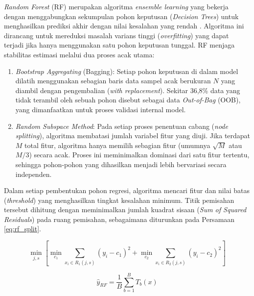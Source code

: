 \textit{Random Forest} (RF) merupakan algoritma \textit{ensemble learning} yang bekerja dengan menggabungkan sekumpulan pohon keputusan (\textit{Decision Trees}) untuk menghasilkan prediksi akhir dengan nilai kesalahan yang rendah \autocite{alarsy2025pm25, abdallah2025predicting}. Algoritma ini dirancang untuk mereduksi masalah varians tinggi (\textit{overfitting}) yang dapat terjadi jika hanya menggunakan satu pohon keputusan tunggal. RF menjaga stabilitas estimasi melalui dua proses acak utama:

\begin{enumerate}
    \item {\textit{Bootstrap Aggregating} (Bagging):} Setiap pohon keputusan di dalam model dilatih menggunakan sebagian baris data sampel acak berukuran $N$ yang diambil dengan pengembalian (\textit{with replacement}). Sekitar 36,8\% data yang tidak terambil oleh sebuah pohon disebut sebagai data \textit{Out-of-Bag} (OOB), yang dimanfaatkan untuk proses validasi internal model.
    \item {\textit{Random Subspace Method}:} Pada setiap proses penentuan cabang (\textit{node splitting}), algoritma membatasi jumlah variabel fitur yang diuji. Jika terdapat $M$ total fitur, algoritma hanya memilih sebagian fitur (umumnya $\sqrt{M}$ atau $M/3$) secara acak. Proses ini meminimalkan dominasi dari satu fitur tertentu, sehingga pohon-pohon yang dihasilkan menjadi lebih bervariasi secara independen.
\end{enumerate}

\bigskip

Dalam setiap pembentukan pohon regresi, algoritma mencari fitur dan nilai batas (\textit{threshold}) yang menghasilkan tingkat kesalahan minimum. Titik pemisahan tersebut dihitung dengan meminimalkan jumlah kuadrat sisaan (\textit{Sum of Squared Residuals}) pada ruang pemisahan, sebagaimana diturunkan pada Persamaan \ref{eq:rf_split}.

\begin{equation}
\min_{j,s} \left[ \min_{c_1} \sum_{x_i \in R_1(j,s)} (y_i - c_1)^2 + \min_{c_2} \sum_{x_i \in R_2(j,s)} (y_i - c_2)^2 \right]
\label{eq:rf_split}
\end{equation}

\begin{equation}
\hat{y}_{RF} = \frac{1}{B} \sum_{b=1}^{B} T_b(x)
\label{eq:rf_math}
\end{equation}

